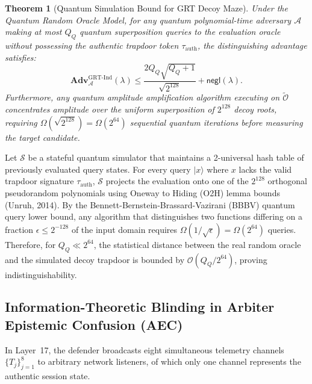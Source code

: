 \documentclass{ieeeaccess}
\newcommand{\Adv}{\mathbf{Adv}}
\newcommand{\negl}{\mathsf{negl}}
\newcommand{\calA}{\mathcal{A}}
\newcommand{\calO}{\mathcal{O}}
\newcommand{\calS}{\mathcal{S}}
\newtheorem{theorem}{Theorem}
\newenvironment{proof}{\begin{IEEEproof}\IEEEQEDoff}{\end{IEEEproof}}
\begin{document}
\begin{theorem}[Quantum Simulation Bound for GRT Decoy Maze]
\label{thm:grt-sim}
Under the Quantum Random Oracle Model, for any quantum polynomial-time adversary $\calA$ making at most $Q_Q$ quantum superposition queries to the evaluation oracle without possessing the authentic trapdoor token $\tau_{\mathrm{auth}}$, the distinguishing advantage satisfies:
\begin{equation}
  \Adv_{\calA}^{\mathrm{GRT\text{-}Ind}}(\lambda) \leq \frac{2 Q_Q \sqrt{Q_Q + 1}}{\sqrt{2^{128}}} + \negl(\lambda).
\end{equation}
Furthermore, any quantum amplitude amplification algorithm executing on $\widetilde{\calO}$ concentrates amplitude over the uniform superposition of $2^{128}$ decoy roots, requiring $\Omega(\sqrt{2^{128}}) = \Omega(2^{64})$ sequential quantum iterations before measuring the target candidate.
\end{theorem}
\begin{proof}
Let $\calS$ be a stateful quantum simulator that maintains a 2-universal hash table of previously evaluated query states. For every query $|x\rangle$ where $x$ lacks the valid trapdoor signature $\tau_{\mathrm{auth}}$, $\calS$ projects the evaluation onto one of the $2^{128}$ orthogonal pseudorandom polynomials using Oneway to Hiding (O2H) lemma bounds (Unruh, 2014). By the Bennett-Bernstein-Brassard-Vazirani (BBBV) quantum query lower bound, any algorithm that distinguishes two functions differing on a fraction $\epsilon \le 2^{-128}$ of the input domain requires $\Omega(1/\sqrt{\epsilon}) = \Omega(2^{64})$ queries. Therefore, for $Q_Q \ll 2^{64}$, the statistical distance between the real random oracle and the simulated decoy trapdoor is bounded by $\calO(Q_Q / 2^{64})$, proving indistinguishability.
\end{proof}

\subsection{Information-Theoretic Blinding in Arbiter Epistemic Confusion (AEC)}
In Layer~17, the defender broadcasts eight simultaneous telemetry channels $\{T_j\}_{j=1}^8$ to arbitrary network listeners, of which only one channel represents the authentic session state.
\end{document}
